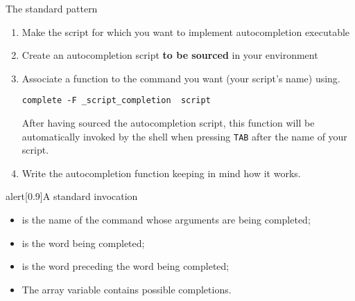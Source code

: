 \begin{frame}[fragile]{The standard pattern}
    \vspace{-3mm}
    \begin{enumerate}
        \item Make the script for which you want to implement autocompletion executable
        \item Create an autocompletion script \textbf{to be sourced} in your environment
        \item Associate a function to the command you want (your script's name) using.
              \begin{lstlisting}[style=myBash, numbers=none, aboveskip=3mm, belowskip=-5mm, xrightmargin=15mm]
                  complete -F _script_completion  script
              \end{lstlisting}
              After having sourced the autocompletion script, this function will be automatically invoked by the shell when pressing \texttt{TAB} after the name of your script.
        \item Write the autocompletion function keeping in mind how it works.
    \end{enumerate}
    \begin{varblock}{alert}[0.9\textwidth]{A standard invocation}
        \begin{itemize}
            \item {} is the name of the command whose arguments are being completed;
            \item {} is the word being completed;
            \item {} is the word preceding the word being completed;
            \item The array variable  contains possible completions.
        \end{itemize}
    \end{varblock}
\end{frame}
